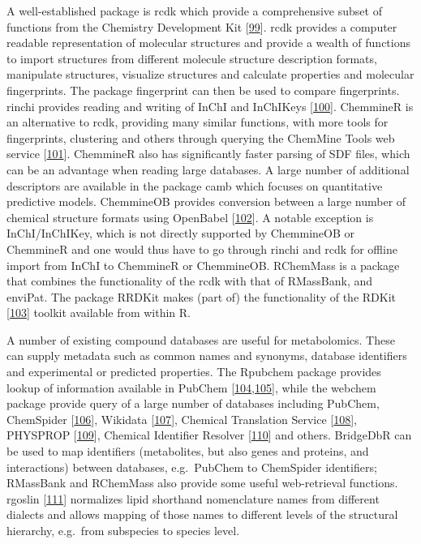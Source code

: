 \documentclass[]{article}
\begin{document}
A well-established package is rcdk which provide a comprehensive subset of functions from the Chemistry Development Kit {[}\protect\hyperlink{ref-willighagen_2017}{99}{]}. rcdk provides a computer readable representation of molecular structures and provide a wealth of functions to import structures from different molecule structure description formats, manipulate structures, visualize structures and calculate properties and molecular fingerprints. The package fingerprint can then be used to compare fingerprints. rinchi provides reading and writing of InChI and InChIKeys {[}\protect\hyperlink{ref-heller_2015}{100}{]}. ChemmineR is an alternative to rcdk, providing many similar functions, with more tools for fingerprints, clustering and others through querying the ChemMine Tools web service {[}\protect\hyperlink{ref-backman_2011}{101}{]}. ChemmineR also has significantly faster parsing of SDF files, which can be an advantage when reading large databases. A large number of additional descriptors are available in the package camb which focuses on quantitative predictive models. ChemmineOB provides conversion between a large number of chemical structure formats using OpenBabel {[}\protect\hyperlink{ref-oboyle_2011}{102}{]}. A notable exception is InChI/InChIKey, which is not directly supported by ChemmineOB or ChemmineR and one would thus have to go through rinchi and rcdk for offline import from InChI to ChemmineR or ChemmineOB. RChemMass is a package that combines the functionality of the rcdk with that of RMassBank, and enviPat. The package RRDKit makes (part of) the functionality of the RDKit {[}\protect\hyperlink{ref-landrum_2016}{103}{]} toolkit available from within R.

A number of existing compound databases are useful for metabolomics. These can supply metadata such as common names and synonyms, database identifiers and experimental or predicted properties. The Rpubchem package provides lookup of information available in PubChem {[}\protect\hyperlink{ref-kim_2016}{104},\protect\hyperlink{ref-wang_2009}{105}{]}, while the webchem package provide query of a large number of databases including PubChem, ChemSpider {[}\protect\hyperlink{ref-pence_2010}{106}{]}, Wikidata {[}\protect\hyperlink{ref-erxleben_2014}{107}{]}, Chemical Translation Service {[}\protect\hyperlink{ref-wohlgemuth_2010}{108}{]}, PHYSPROP {[}\protect\hyperlink{ref-srcinc_website_nd}{109}{]}, Chemical Identifier Resolver {[}\protect\hyperlink{ref-ncicaddgroup_website_nd}{110}{]} and others. BridgeDbR can be used to map identifiers (metabolites, but also genes and proteins, and interactions) between databases, e.g.~PubChem to ChemSpider identifiers; RMassBank and RChemMass also provide some useful web-retrieval functions. rgoslin {[}\protect\hyperlink{ref-kopczynski_2020}{111}{]} normalizes lipid shorthand nomenclature names from different dialects and allows mapping of those names to different levels of the structural hierarchy, e.g.~from subspecies to species level.
\end{document}
